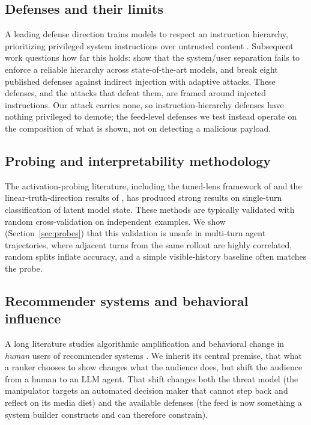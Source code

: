 \documentclass[11pt,letterpaper]{article}
\begin{document}
\subsection{Defenses and their limits}
A leading defense direction trains models to respect an instruction hierarchy,
prioritizing privileged system instructions over untrusted content
\citep{wallace2024instruction}. Subsequent work questions how far this holds:
\citet{geng2025control} show that the system/user separation fails to enforce a
reliable hierarchy across state-of-the-art models, and \citet{zhan2025adaptive}
break eight published defenses against indirect injection with adaptive attacks.
These defenses, and the attacks that defeat them, are framed around injected
instructions. Our attack carries none, so instruction-hierarchy defenses have
nothing privileged to demote; the feed-level defenses we test instead operate on
the composition of what is shown, not on detecting a malicious payload.

\subsection{Probing and interpretability methodology}
The activation-probing literature, including the tuned-lens framework of
\citet{belrose2023eliciting} and the linear-truth-direction results of
\citet{marks2023geometry}, has produced strong results on single-turn
classification of latent model state. These methods are typically validated
with random cross-validation on independent examples. We show
(Section~\ref{sec:probes}) that this validation is unsafe in multi-turn agent
trajectories, where adjacent turns from the same rollout are highly correlated,
random splits inflate accuracy, and a simple visible-history baseline often
matches the probe.

\subsection{Recommender systems and behavioral influence}
A long literature studies algorithmic amplification and behavioral change in
\emph{human} users of recommender systems \citep{narayanan2023algorithmic}. We
inherit its central premise, that what a ranker chooses to show changes what
the audience does, but shift the audience from a human to an LLM agent. That
shift changes both the threat model (the manipulator targets an automated
decision maker that cannot step back and reflect on its media diet) and the
available defenses (the feed is now something a system builder constructs and
can therefore constrain).
\end{document}
